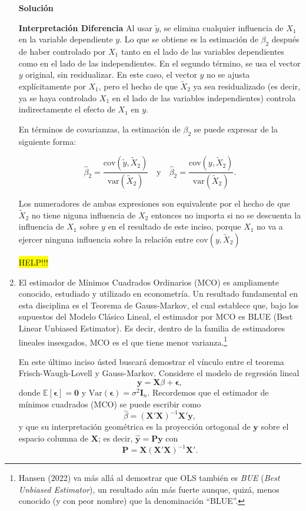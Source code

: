 \documentclass[a4paper, answers, addpoints, 11pt]{exam}
\newenvironment{solucion}{%
  \begin{mdframed}[
    backgroundcolor=blue!5,    %
    linecolor=blue!50,          %
    linewidth=2pt,              %
    leftmargin=10pt,            %
    rightmargin=10pt,           %
    topline=true,              %
    bottomline=true,            %
    roundcorner=10pt,           %
    innerleftmargin=10pt,       %
    innerrightmargin=10pt,      %
    innerbottommargin=10pt,     %
    innertopmargin=10pt         %
  ]%
  \begin{tcolorbox}[colframe=blue!50!black, colback=blue!50, coltitle=white, sharp corners=all, boxrule=1mm, width=\textwidth, halign=left, valign=center, top=0mm, bottom=0mm, left=0mm, right=0mm] \textbf{Solución} \end{tcolorbox} }{\end{mdframed}}
\begin{document}
\begin{enumerate}
\begin{solucion}
\textbf{Interpretación Diferencia}
Al usar \( \tilde{y} \), se elimina cualquier influencia de \( X_1 \) en la variable dependiente \( y \). Lo que se obtiene es la estimación de \( \beta_2 \) después de haber controlado por \( X_1 \) tanto en el lado de las variables dependientes como en el lado de las independientes. En el segundo término, se usa el vector \( y \) original, sin residualizar. En este caso, el vector \( y \) no se ajusta explícitamente por \( X_1 \), pero el hecho de que \( \tilde{X}_2 \) ya sea residualizado (es decir, ya se haya controlado \( X_1 \) en el lado de las variables independientes) controla indirectamente el efecto de \( X_1 \) en \( y \).

En términos de covarianzas, la estimación de \( \beta_2 \) se puede expresar de la siguiente forma:

\[
\hat{\beta}_2 = \frac{\text{cov}(\tilde{y}, \tilde{X}_2)}{\text{var}(\tilde{X}_2)} \quad \text{y} \quad \hat{\beta}_2 = \frac{\text{cov}(y, \tilde{X}_2)}{\text{var}(\tilde{X}_2)}.
\]

Los numeradores de ambas expresiones son equivalente por el hecho de que \( \tilde{X}_2 \) no tiene niguna influencia de \( X_2 \) entonces no importa si no se descuenta la influencia de \( X_1 \) sobre \( y \) en el resultado de este inciso, porque \( X_1 \) no va a ejercer ninguna influencia sobre la relación entre 
$\text{cov}(y, \tilde{X}_2)$

\colorbox{yellow}{HELP!!!}

\end{solucion}

    \item El estimador de Mínimos Cuadrados Ordinarios (MCO) es ampliamente conocido, estudiado y utilizado en econometría. Un resultado fundamental en esta disciplina es el Teorema de Gauss-Markov, el cual establece que, bajo los supuestos del Modelo Clásico Lineal, el estimador por MCO es BLUE (Best Linear Unbiased Estimator). Es decir, dentro de la familia de estimadores lineales insesgados, MCO es el que tiene menor varianza.\footnote{Hansen (2022) va más allá al demostrar que OLS también es \textit{BUE} (\textit{Best Unbiased Estimator}), un resultado aún más fuerte aunque, quizá, menos conocido (y con peor nombre) que la denominación ``BLUE''.}  
    
    En este último inciso ústed buscará demostrar el vínculo entre el teorema Frisch-Waugh-Lovell y Gauss-Markov. Considere el modelo de regresión lineal
\begin{equation}\label{EQ:modeloGM}
    \mathbf{y} = \mathbf{X}\beta + \boldsymbol\epsilon,
\end{equation}
donde \(\mathbb{E}[\boldsymbol\epsilon] = \mathbf{0}\) y \(\mathrm{Var}(\boldsymbol\epsilon)=\sigma^2 \mathbf{I}_n\). Recordemos que el estimador de mínimos cuadrados (MCO) se puede escribir como
\[
\hat{\beta} = (\mathbf{X}'\mathbf{X})^{-1}\mathbf{X}'\mathbf{y},
\]
y que su interpretación geométrica es la proyección ortogonal de \(\mathbf{y}\) sobre el espacio columna de \(\mathbf{X}\); es decir, \(\hat{\mathbf{y}} = \mathbf{P}\mathbf{y}\) con
\[
\mathbf{P} = \mathbf{X}(\mathbf{X}'\mathbf{X})^{-1}\mathbf{X}'.
\]


\end{enumerate}
\end{document}
